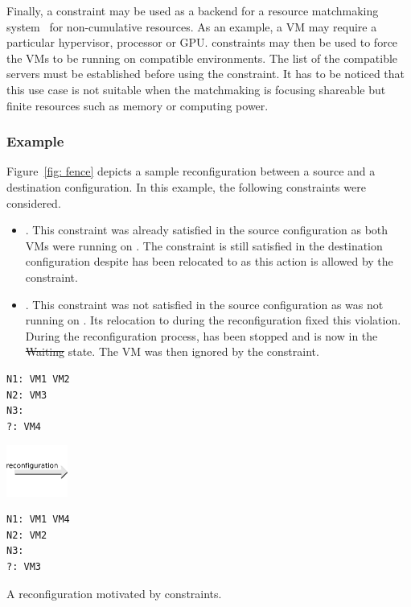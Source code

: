 Finally, a  constraint may be used as a backend for a resource matchmaking
system~\cite{condor-classad} for non-cumulative resources. As an example, a VM may require a particular
hypervisor, processor or GPU.  constraints may then be used to force the VMs to be running on compatible environments. The list of the compatible servers must be established before using the constraint. It has to be noticed that this use case is not suitable when the matchmaking is focusing shareable but finite resources such as memory or computing power.


\subsubsection{Example}

Figure~\ref{fig: fence} depicts a sample reconfiguration between a source and a destination configuration. In this example, the following  constraints were considered.
\begin{itemize}

\item {}. This constraint was already satisfied in the source configuration as both VMs were running on . The constraint is still satisfied in the destination configuration despite  has been relocated to  as this action is allowed by the constraint.

\item {}. This constraint was not satisfied in the source configuration as  was not running on . Its relocation to  during the reconfiguration fixed this violation. During the reconfiguration process,  has been stopped and is now in the \st{Waiting} state. The VM was then ignored by the constraint.
\end{itemize}

\begin{reconfiguration}
\centering
\begin{minipage}[b]{0.40\textwidth}
\begin{lstlisting}
N1: VM1 VM2
N2: VM3
N3:
?: VM4
\end{lstlisting}
\end{minipage}
\begin{minipage}[b]{2cm}
\includegraphics[width=2cm]{img/arrow_reconfiguration}
\end{minipage}
\begin{minipage}[b]{0.40\textwidth}
\begin{lstlisting}
N1: VM1 VM4
N2: VM2
N3:
?: VM3
\end{lstlisting}
\end{minipage}
\caption{A reconfiguration motivated by  constraints.}\label{fig: fence}
\end{reconfiguration}

